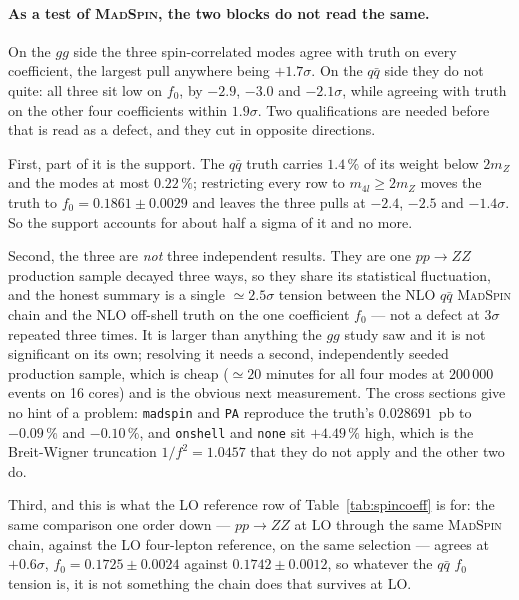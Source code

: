 \documentclass[a4paper,11pt]{article}
\providecommand{\ms}{{\textsc{MadSpin}}}
\providecommand{\code}[1]{\texttt{#1}}
\begin{document}
\paragraph{As a test of \ms, the two blocks do not read the same.} On the $gg$
side the three spin-correlated modes agree with truth on every coefficient, the
largest pull anywhere being $+1.7\sigma$. On the $q\bar q$ side they do not
quite: all three sit low on $f_0$, by $-2.9$, $-3.0$ and $-2.1\sigma$, while
agreeing with truth on the other four coefficients within $1.9\sigma$. Two
qualifications are needed before that is read as a defect, and they cut in
opposite directions.

First, part of it is the support. The $q\bar q$ truth carries $1.4\,\%$ of its
weight below $2m_Z$ and the modes at most $0.22\,\%$; restricting every row to
$m_{4l}\ge2m_Z$ moves the truth to $f_0=0.1861\pm0.0029$ and leaves the three
pulls at $-2.4$, $-2.5$ and $-1.4\sigma$. So the support accounts for about half
a sigma of it and no more.

Second, the three are \emph{not} three independent results. They are one
$pp\to ZZ$ production sample decayed three ways, so they share its statistical
fluctuation, and the honest summary is a single $\simeq2.5\sigma$ tension
between the NLO $q\bar q$ \ms{} chain and the NLO off-shell truth on the one
coefficient $f_0$ --- not a defect at $3\sigma$ repeated three times. It is
larger than anything the $gg$ study saw and it is not significant on its own;
resolving it needs a second, independently seeded production sample, which is
cheap ($\simeq20$ minutes for all four modes at $200\,000$ events on 16 cores)
and is the obvious next measurement. The cross sections give no hint of a
problem: \code{madspin} and \code{PA} reproduce the truth's $0.028691$~pb to
$-0.09\,\%$ and $-0.10\,\%$, and \code{onshell} and \code{none} sit
$+4.49\,\%$ high, which is the Breit-Wigner truncation $1/f^2=1.0457$ that they
do not apply and the other two do.

Third, and this is what the LO reference row of Table~\ref{tab:spincoeff} is
for: the same comparison one order down --- $pp\to ZZ$ at LO through the same
\ms{} chain, against the LO four-lepton reference, on the same selection ---
agrees at $+0.6\sigma$, $f_0=0.1725\pm0.0024$ against $0.1742\pm0.0012$, so
whatever the $q\bar q$ $f_0$ tension is, it is not something the chain does
that survives at LO.
\end{document}
